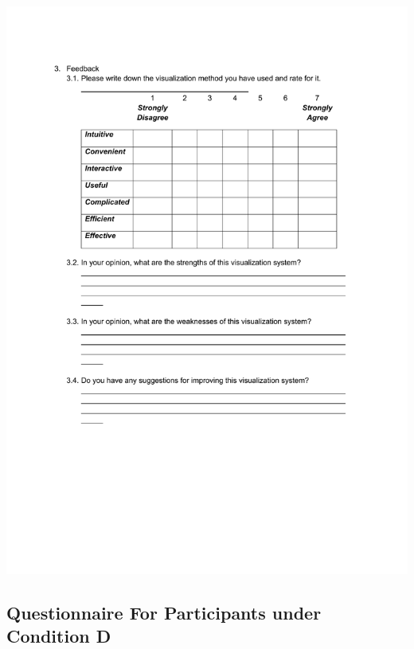 \includegraphics[scale=0.8]{us/q403.pdf}

\subsection{Questionnaire For Participants under Condition D}
